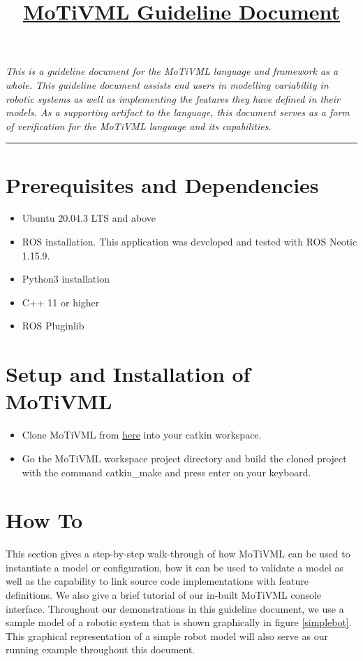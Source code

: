 \documentclass{article}
\title{\underline{\textbf{MoTiVML Guideline Document}}}
\author{}
\date{}
\begin{document}
\maketitle
\textit{This is a guideline document for the MoTiVML language and framework as a whole. This guideline document assists end users in modelling variability in robotic systems as well as implementing the features they have defined in their models. As a supporting artifact to the language,  this document serves as a form of verification for the MoTiVML language and its capabilities.}

\noindent\rule{17cm}{0.4pt}

\label{guide:docs}
\section{Prerequisites and Dependencies}
    \begin{itemize}
        \item Ubuntu 20.04.3 LTS and above
        \item ROS installation. This application was developed and tested with ROS Neotic 1.15.9.
        \item Python3 installation
        \item C++ 11 or higher
        \item ROS Pluginlib
    \end{itemize}

\section{Setup and Installation of MoTiVML}
\begin{itemize}
    \item Clone MoTiVML from \href{https://github.com/SergioGarG/sera-extension}{here} into your catkin workspace.
    \item Go the MoTiVML workspace project directory and build the cloned project with the command catkin\_make and press enter on your keyboard.
\end{itemize}

\section{How To}
This section gives a step-by-step walk-through of how MoTiVML can be used to instantiate a model or configuration, how it can be used to validate a model as well as the capability to link source code implementations with feature definitions. We also give a brief tutorial of our in-built MoTiVML console interface. Throughout our demonstrations in this guideline document, we use a sample model of a robotic system that is shown graphically in figure \ref{simplebot}. This graphical representation of a simple robot model will also serve as our running example throughout this document.
\end{document}
